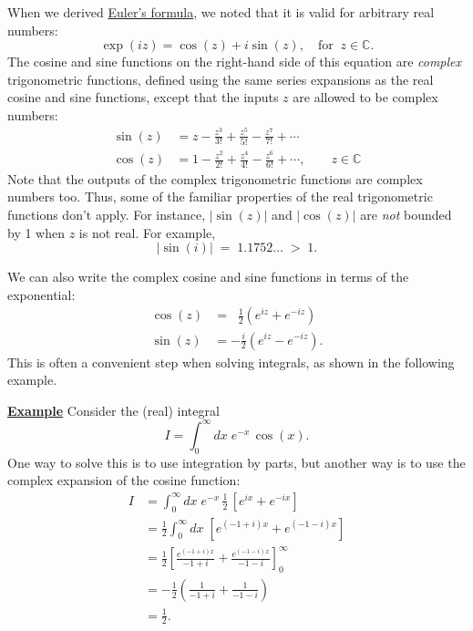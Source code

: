 \documentclass[10pt,a4paper]{article}
\begin{document}
When we derived \protect\hyperlink{euler_formula}{Euler's formula}, we
noted that it is valid for arbitrary real numbers:
\begin{equation}
  \exp(iz) = \cos(z) + i \sin(z), \quad \mathrm{for}\;\;z\in\mathbb{C}.
\end{equation}
The cosine and sine functions on the right-hand side of this equation
are \textit{complex} trigonometric functions, defined using the same
series expansions as the real cosine and sine functions, except that
the inputs $z$ are allowed to be complex numbers:
\begin{align}
  \sin(z) &= z - \frac{z^3}{3!} + \frac{z^5}{5!} - \frac{z^7}{7!} + \cdots \\
  \cos(z) &= 1 - \frac{z^2}{2!} + \frac{z^4}{4!} - \frac{z^6}{6!} + \cdots, 
  \quad\quad z\in \mathbb{C}
\end{align}
Note that the outputs of the complex trigonometric functions are
complex numbers too. Thus, some of the familiar properties of the real
trigonometric functions don't apply. For instance, $|\sin(z)|$ and
$|\cos(z)|$ are \emph{not} bounded by 1 when $z$ is not real. For
example,
\begin{equation}
\Big|\sin(i)\Big| \;=\; 1.1752\dots \; >\; 1.
\end{equation}

We can also write the complex cosine and sine functions in terms of
the exponential:
\begin{align}
  \cos(z) &= \;\;\frac{1}{2}\left(e^{iz} + e^{-iz}\right) \\
  \sin(z) &= -\frac{i}{2}\left(e^{iz} - e^{-iz}\right).
\end{align}
This is often a convenient step when solving integrals, as shown in
the following example.

\begin{framed}
\noindent
\underline{\textbf{Example}}
\vskip 0.1in \noindent
Consider the (real) integral
\begin{equation}
I = \int_0^\infty dx \; e^{- x} \, \cos(x).
\end{equation}
One way to solve this is to use integration by parts, but another way
is to use the complex expansion of the cosine function:
\begin{align}I &= \int_0^\infty dx \; e^{- x} \,\frac{1}{2}\, \left[e^{ix} + e^{-ix}\right] \\ &= \frac{1}{2} \int_0^\infty dx \; \left[e^{(-1+i)x} + e^{(-1-i)x}\right] \\ &= \frac{1}{2} \left[ \frac{e^{(-1+i) x}}{-1+i} + \frac{e^{(-1 - i) x}}{-1 - i}\right]_0^\infty \\ &= -\frac{1}{2} \left(\frac{1}{-1+i} + \frac{1}{-1 - i}\right) \\ &= \frac{1}{2}.\end{align}
\end{framed}
\end{document}
